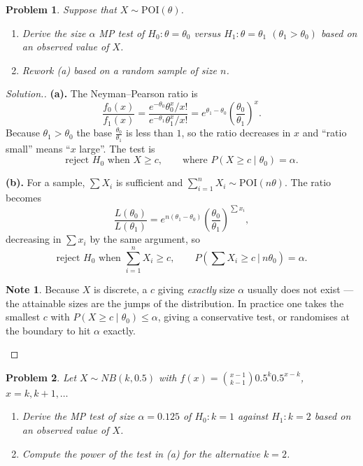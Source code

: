 \documentclass[12pt,a4paper]{report}
\theoremstyle{definition}
\newtheorem{note}[thm]{Note}
\theoremstyle{plain}
\newtheorem{problemx}{Problem}[section]
\newenvironment{problem}{\begin{problemx}}{\end{problemx}}
\newenvironment{solution}
  {\renewcommand{\qedsymbol}{}\begin{proof}[\textit{Solution}.]}
  {\end{proof}}
\begin{document}
\begin{problem}
Suppose that $X\sim\text{POI}(\theta)$.
\begin{enumerate}
\item[(a).] Derive the size $\alpha$ MP test of $H_0:\theta=\theta_0$ versus
$H_1:\theta=\theta_1$ $(\theta_1>\theta_0)$ based on an observed value of $X$.
\item[(b).] Rework (a) based on a random sample of size $n$.
\end{enumerate}
\end{problem}

\begin{solution}
\textbf{(a).} The Neyman--Pearson ratio is
\[\frac{f_0(x)}{f_1(x)}
=\frac{e^{-\theta_0}\theta_0^x/x!}{e^{-\theta_1}\theta_1^x/x!}
=e^{\theta_1-\theta_0}\left(\frac{\theta_0}{\theta_1}\right)^x.\]
Because $\theta_1>\theta_0$ the base $\frac{\theta_0}{\theta_1}$ is less than $1$,
so the ratio decreases in $x$ and ``ratio small'' means ``$x$ large''. The test is
\[\text{reject } H_0 \text{ when } X\geq c,\qquad\text{where }
P\left(X\geq c\mid\theta_0\right)=\alpha.\]

\textbf{(b).} For a sample, $\sum X_i$ is sufficient and
$\sum_{i=1}^nX_i\sim\text{POI}(n\theta)$. The ratio becomes
\[\frac{L(\theta_0)}{L(\theta_1)}=e^{n(\theta_1-\theta_0)}
\left(\frac{\theta_0}{\theta_1}\right)^{\sum x_i},\]
decreasing in $\sum x_i$ by the same argument, so
\[\text{reject } H_0 \text{ when } \sum_{i=1}^nX_i\geq c,\qquad
P\left(\sum X_i\geq c\ |\ n\theta_0\right)=\alpha.\]

\begin{note}
Because $X$ is discrete, a $c$ giving \emph{exactly} size $\alpha$ usually does not
exist --- the attainable sizes are the jumps of the distribution. In practice one
takes the smallest $c$ with $P(X\geq c\mid\theta_0)\leq\alpha$, giving a
conservative test, or randomises at the boundary to hit $\alpha$ exactly.
\end{note}
\end{solution}

\begin{problem}
Let $X\sim NB(k,0.5)$ with $f(x)=\binom{x-1}{k-1}0.5^k0.5^{x-k}$,
$x=k,k+1,\ldots$
\begin{enumerate}
\item[(a).] Derive the MP test of size $\alpha=0.125$ of $H_0:k=1$ against
$H_1:k=2$ based on an observed value of $X$.
\item[(b).] Compute the power of the test in (a) for the alternative $k=2$.
\end{enumerate}
\end{problem}
\end{document}
